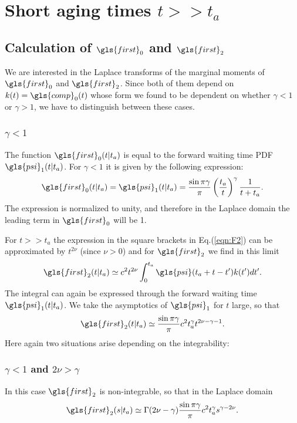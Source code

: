 \section{Short aging times $t>> t_a$}

\subsection{Calculation of $\gls{first}_0$ and $\gls{first}_2$}

We are interested in the Laplace transforms of the marginal moments of $\gls{first}_0$ and $\gls{first}_2$. Since both of them depend on $k(t)=\gls{comp}_0(t)$ 
whose form we found to be dependent on whether $\gamma<1$ or $\gamma>1$, we have to distinguish between these cases.

\subsubsection{$\gamma<1$}
The function $\gls{first}_0(t|t_a)$ is equal to the forward waiting time PDF $\gls{psi}_1(t|t_a)$. For $\gamma<1$
it is given by the following expression:
\begin{equation}
 \gls{first}_0(t|t_a) = \gls{psi}_1(t|t_a) = \frac{\sin \pi \gamma}{\pi} \left( \frac{t_a}{t}\right)^\gamma \frac{1}{t+t_a}. \label{eqn:psi1}
\end{equation}
The expression is normalized to unity, and therefore in the Laplace domain the leading term in $\gls{first}_0$ will be 1. 

For  $t>>t_a$ the expression in the square brackets in Eq.(\ref{eqn:F2}) can be approximated by $t^{2\nu}$ (since $\nu > 0$) and for $\gls{first}_2$ we find in this limit
\begin{equation}
 \gls{first}_2(t|t_a) \simeq  c^2 t^{2\nu} \int_0^{t_a} \gls{psi}(t_a+t-t') k(t') dt'.
\end{equation}
The integral can again be expressed through the forward waiting time $\gls{psi}_1(t|t_a)$. We take the asymptotics of $\gls{psi}_1$ for $t$ large, so that 
\begin{equation}
\gls{first}_2(t|t_a) \simeq \frac{\sin \pi \gamma}{\pi} c^2  t_a^\gamma t^{2\nu-\gamma -1}  .  
\end{equation}
Here again two situations arise depending on the integrability: 

\subsubsection{$\gamma <1$ and  $2 \nu > \gamma$}
In this case $\gls{first}_2$ is non-integrable, so that in the Laplace domain
\begin{equation}
 \gls{first}_2(s|t_a) \simeq \Gamma(2\nu-\gamma) \frac{\sin \pi \gamma}{\pi} c^2 t_a^\gamma s^{\gamma - 2\nu}.
\end{equation}

